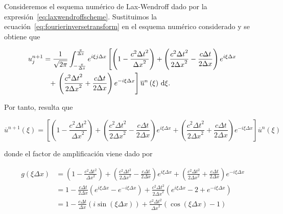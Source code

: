 \begin{example}
  Consideremos el esquema numérico de Lax-Wendroff dado por la
  expresión~\eqref{eq:laxwendroffscheme}.
  Sustituimos la ecuación~\eqref{eq:fourierinversetransform} en el
  esquema numérico considerado y se obtiene que

  \begin{gather*}
    \begin{split}
      u^{n+1}_{j}
       & =
      \frac{1}{\sqrt{2\pi}}
      \int_{-\frac{\pi}{\Delta x}}^{\frac{\pi}{\Delta x}}
      e^{i\xi j\Delta x}
      \left[
        \left(
        1-
        \frac{c^{2}{\Delta t}^{2}}{{\Delta x}^{2}}
        \right)+
        \left(
        \frac{c^{2}{\Delta t}^{2}}{2{\Delta x}^{2}}-
        \frac{c\Delta t}{2\Delta x}
        \right)
      e^{i\xi\Delta x}\right. \\
       & \phantom{=}
        +\left.
        \left(
        \frac{c^{2}{\Delta t}^{2}}{2{\Delta x}^{2}}+
        \frac{c\Delta t}{2\Delta x}
        \right)
        e^{-i\xi\Delta x}
        \right]
      \overline{u}^{n}
      \left(\xi\right)\dl\xi.
    \end{split}
  \end{gather*}

  Por tanto, resulta que

  \begin{equation*}
    \overline{u}^{n+1}
    \left(\xi\right)=
    \left[
      \left(
      1-
      \frac{c^{2}{\Delta t}^{2}}{{\Delta x}^{2}}
      \right)+
      \left(
      \frac{c^{2}{\Delta t}^{2}}{2{\Delta x}^{2}}-
      \frac{c\Delta t}{2\Delta x}
      \right)
      e^{i\xi\Delta x}+
      \left(
      \frac{c^{2}{\Delta t}^{2}}{2{\Delta x}^{2}}+
      \frac{c\Delta t}{2\Delta x}
      \right)
      e^{-i\xi\Delta x}
      \right]
    \overline{u}^{n}
    \left(\xi\right)
  \end{equation*}

  donde el factor de amplificación viene dado por

  \begin{align*}
    g
    \left(\xi\Delta x\right) & =
    \left(
    1-
    \frac{c^{2}{\Delta t}^{2}}{{\Delta x}^{2}}
    \right)+
    \left(
    \frac{c^{2}{\Delta t}^{2}}{2{\Delta x}^{2}}-
    \frac{c\Delta t}{2\Delta x}
    \right)
    e^{i\xi\Delta x}+
    \left(
    \frac{c^{2}{\Delta t}^{2}}{2{\Delta x}^{2}}+
    \frac{c\Delta t}{2\Delta x}
    \right)
    e^{-i\xi\Delta x}            \\
                             & =
    1-
    \frac{c\Delta t}{2\Delta x}
    \left(e^{i\xi\Delta x}-
    e^{-i\xi\Delta x}\right)+
    \frac{c^{2}{\Delta t}^{2}}{2{\Delta x}^{2}}
    \left(e^{i\xi\Delta x}-
    2+
    e^{-i\xi\Delta x}\right)     \\
                             & =
    1-\frac{c\Delta t}{\Delta x}
    \left(
    i\sin
    \left(\xi\Delta x\right)
    \right)+
    \frac{c^{2}{\Delta t}^{2}}{{\Delta x}^{2}}
    \left(
    \cos
    \left(\xi\Delta x\right)-
    1
    \right)
  \end{align*}


\end{example}
